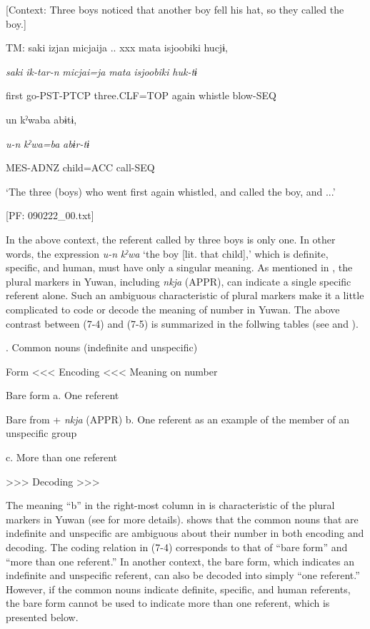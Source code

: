   [Context: Three boys noticed that another boy fell his hat, so they called the boy.]

  TM:  saki  izjan  micjaija ..  xxx  mata  isjoobiki  hucjɨ,

    \textit{saki}  \textit{ik-tar-n}  \textit{micjai=ja}    \textit{mata}  \textit{isjoobiki}  \textit{huk-tɨ}

    first  go-PST-PTCP  three.CLF=TOP    again  whistle  blow-SEQ

    un  kˀwaba  abɨtɨ,

    \textit{u-n}  \textit{kˀwa=ba}  \textit{abɨr-tɨ}

    MES-ADNZ  child=ACC  call-SEQ

    ‘The three (boys) who went first again whistled, and called the boy, and ...’

    [PF: 090222\_00.txt]

In the above context, the referent called by three boys is only one. In other words, the expression \textit{u-n} \textit{kˀwa} ‘the boy [lit. that child],’ which is definite, specific, and human, must have only a singular meaning. As mentioned in , the plural markers in Yuwan, including \textit{nkja} (APPR), can indicate a single specific referent alone. Such an ambiguous characteristic of plural markers make it a little complicated to code or decode the meaning of number in Yuwan. The above contrast between (7-4) and (7-5) is summarized in the follwing tables (see  and ).

\begin{styleBeschriftung}
\textmd{}\textmd{. Common nouns (indefinite and unspecific)}
\end{styleBeschriftung}

Form  <<< Encoding <<<  Meaning on number

Bare form  %
  a.  One referent

Bare from + \textit{nkja} (APPR)  %
  b.  One referent as an example of the member of an unspecific group

    c.  More than one referent

  >>> Decoding >>>  

The meaning “b” in the right-most column in  is characteristic of the plural markers in Yuwan (see  for more details).  shows that the common nouns that are indefinite and unspecific are ambiguous about their number in both encoding and decoding. The coding relation in (7-4) corresponds to that of “bare form” and “more than one referent.” In another context, the bare form, which indicates an indefinite and unspecific referent, can also be decoded into simply “one referent.” However, if the common nouns indicate definite, specific, and human referents, the bare form cannot be used to indicate more than one referent, which is presented below.

